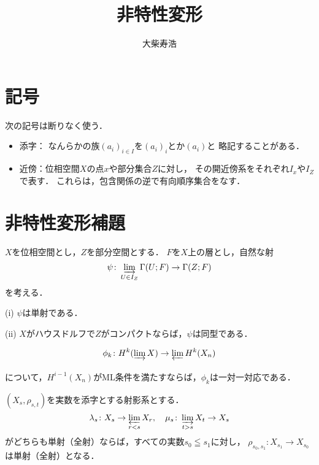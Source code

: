 \title{非特性変形}
\author{大柴寿浩}
\date{}

\maketitle



\section*{記号}
次の記号は断りなく使う．
\begin{itemize}
    \item 添字：
    なんらかの族$(a_i)_{i\in I}$を$(a_i)_i$とか$(a_i)$と
    略記することがある．
    \item 近傍：位相空間\(X\)の点\(x\)や部分集合\(Z\)に対し，
    その開近傍系をそれぞれ\(I_x\)や\(I_Z\)で表す．
    これらは，包含関係の逆で有向順序集合をなす．
\end{itemize}



\section{非特性変形補題}
\begin{leftbar}
\begin{PRP}[{\cite[Prop. 2.5.1]{KS90}}]\label{PRP2.5.1}
    \(X\)を位相空間とし，\(Z\)を部分空間とする．
    \(F\)を\(X\)上の層とし，自然な射
    \[
        \psi\colon\indlim[U\in I_Z]\Gamma(U;F)\to\Gamma(Z;F)
    \]を考える．

    (i) 
    \(\psi\)は単射である．

    (ii)
    \(X\)がハウスドルフで\(Z\)がコンパクトならば，\(\psi\)は同型である．
\end{PRP}
\end{leftbar}
\begin{leftbar}
    \begin{PRP}[{\cite[Prop. 1.12.4]{KS90}}]\label{PRP1.12.4}
        \[
            \phi_k\colon H^k(\indlim X)\to\prolim H^k(X_n)
        \]
        について，\(H^{i-1}(X_n)\)がML条件を満たすならば，\(\phi_k\)は一対一対応である．
    \end{PRP}
\end{leftbar}
    
\begin{leftbar}
\begin{PRP}[{\cite[Prop. 1.12.6]{KS90}}]\label{PRP1.12.6}
    \((X_s,\rho_{s,t})\)を実数を添字とする射影系とする．
    \[
        \lambda_s\colon X_s\to\prolim[r<s]X_r,
        \quad
        \mu_s\colon\indlim[t>s]X_t\to X_s
    \]
    がどちらも単射（全射）ならば，すべての実数\(s_0\leqq s_1\)に対し，
    \(\rho_{s_0,s_1}\colon X_{s_1}\to X_{s_0}\)は単射（全射）となる．
\end{PRP}
\end{leftbar}

